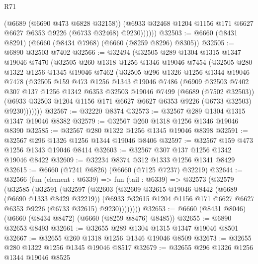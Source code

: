 \begin{lexlean}{R71}
\begin{coremodule}
              (@6689 (@6690 @473 @6828 @32158))
              (@6933 @32468 @1204 @1156 @171 @6627 @6627 @6353 @9226 (@6733 @32468) @9230))))))
@32503 := @6660 (@8431 @8291) (@6660 (@8434 @7968) (@6660 (@8259 @8296) @8305))
@32505 := @6890 @32503 @7402
@32566 := @32494
    (@32505
      @289
      @1304
      @1315
      @1347
      @19046
      @7470
      (@32505
        @260
        @1318
        @1256
        @1346
        @19046
        @7454
        (@32505
          @280
          @1322
          @1256
          @1345
          @19046
          @7462
          (@32505
            @296
            @1326
            @1256
            @1344
            @19046
            @7478
            (@32505
              @159
              @473
              @1256
              @1343
              @19046
              @7486
              (@6909
                @32503
                @7402
                @307
                @137
                @1256
                @1342
                @6353
                @32503
                @19046
                @7499
                (@6689 (@7502 @32503))
                (@6933 @32503 @1204 @1156 @171 @6627 @6627 @6353 @9226 (@6733 @32503) @9230)))))))
@32567 := @32220 @8374
@32573 := @32567 @289 @1304 @1315 @1347 @19046 @8382
@32579 := @32567 @260 @1318 @1256 @1346 @19046 @8390
@32585 := @32567 @280 @1322 @1256 @1345 @19046 @8398
@32591 := @32567 @296 @1326 @1256 @1344 @19046 @8406
@32597 := @32567 @159 @473 @1256 @1343 @19046 @8414
@32603 := @32567 @307 @137 @1256 @1342 @19046 @8422
@32609 := @32234 @8374 @312 @1333 @1256 @1341 @8429
@32615 := @6660 (@7241 @6826) (@6660 (@7125 @7237) @32219)
@32644 := @32566
    (fun (element : @6339) =>
    fun (tail : @6339) =>
    @32573
      (@32579
        (@32585
          (@32591
            (@32597
              (@32603
                (@32609
                  @32615
                  @19046
                  @8442
                  (@6689 (@6690 @1333 @8429 @32219))
                  (@6933
                    @32615
                    @1204
                    @1156
                    @171
                    @6627
                    @6627
                    @6353
                    @9226
                    (@6733 @32615)
                    @9230))))))))
@32653 := @6660 (@8431 @8046) (@6660 (@8434 @8472) (@6660 (@8259 @8476) @8485))
@32655 := @6890 @32653 @8493
@32661 := @32655 @289 @1304 @1315 @1347 @19046 @8501
@32667 := @32655 @260 @1318 @1256 @1346 @19046 @8509
@32673 := @32655 @280 @1322 @1256 @1345 @19046 @8517
@32679 := @32655 @296 @1326 @1256 @1344 @19046 @8525

\end{coremodule}
\end{lexlean}
